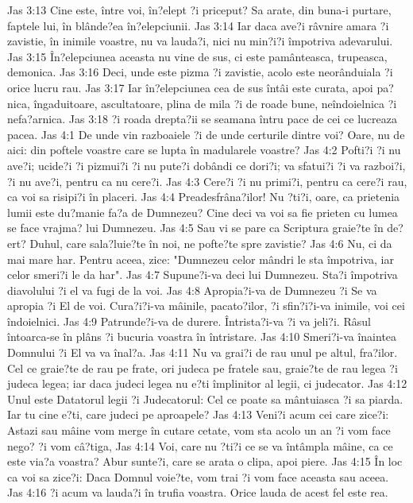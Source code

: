 Jas 3:13  Cine este, între voi, în?elept ?i priceput? Sa arate, din buna-i purtare, faptele lui, în blânde?ea în?elepciunii.
Jas 3:14  Iar daca ave?i râvnire amara ?i zavistie, în inimile voastre, nu va lauda?i, nici nu min?i?i împotriva adevarului.
Jas 3:15  În?elepciunea aceasta nu vine de sus, ci este pamânteasca, trupeasca, demonica.
Jas 3:16  Deci, unde este pizma ?i zavistie, acolo este neorânduiala ?i orice lucru rau.
Jas 3:17  Iar în?elepciunea cea de sus întâi este curata, apoi pa?nica, îngaduitoare, ascultatoare, plina de mila ?i de roade bune, neîndoielnica ?i nefa?arnica.
Jas 3:18  ?i roada drepta?ii se seamana întru pace de cei ce lucreaza pacea.
Jas 4:1  De unde vin razboaiele ?i de unde certurile dintre voi? Oare, nu de aici: din poftele voastre care se lupta în madularele voastre?
Jas 4:2  Pofti?i ?i nu ave?i; ucide?i ?i pizmui?i ?i nu pute?i dobândi ce dori?i; va sfatui?i ?i va razboi?i, ?i nu ave?i, pentru ca nu cere?i.
Jas 4:3  Cere?i ?i nu primi?i, pentru ca cere?i rau, ca voi sa risipi?i în placeri.
Jas 4:4  Preadesfrâna?ilor! Nu ?ti?i, oare, ca prietenia lumii este du?manie fa?a de Dumnezeu? Cine deci va voi sa fie prieten cu lumea se face vrajma? lui Dumnezeu.
Jas 4:5  Sau vi se pare ca Scriptura graie?te în de?ert? Duhul, care sala?luie?te în noi, ne pofte?te spre zavistie?
Jas 4:6  Nu, ci da mai mare har. Pentru aceea, zice: "Dumnezeu celor mândri le sta împotriva, iar celor smeri?i le da har".
Jas 4:7  Supune?i-va deci lui Dumnezeu. Sta?i împotriva diavolului ?i el va fugi de la voi.
Jas 4:8  Apropia?i-va de Dumnezeu ?i Se va apropia ?i El de voi. Cura?i?i-va mâinile, pacato?ilor, ?i sfin?i?i-va inimile, voi cei îndoielnici.
Jas 4:9  Patrunde?i-va de durere. Întrista?i-va ?i va jeli?i. Râsul întoarca-se în plâns ?i bucuria voastra în întristare.
Jas 4:10  Smeri?i-va înaintea Domnului ?i El va va înal?a.
Jas 4:11  Nu va grai?i de rau unul pe altul, fra?ilor. Cel ce graie?te de rau pe frate, ori judeca pe fratele sau, graie?te de rau legea ?i judeca legea; iar daca judeci legea nu e?ti împlinitor al legii, ci judecator.
Jas 4:12  Unul este Datatorul legii ?i Judecatorul: Cel ce poate sa mântuiasca ?i sa piarda. Iar tu cine e?ti, care judeci pe aproapele?
Jas 4:13  Veni?i acum cei care zice?i: Astazi sau mâine vom merge în cutare cetate, vom sta acolo un an ?i vom face nego? ?i vom câ?tiga,
Jas 4:14  Voi, care nu ?ti?i ce se va întâmpla mâine, ca ce este via?a voastra? Abur sunte?i, care se arata o clipa, apoi piere.
Jas 4:15  În loc ca voi sa zice?i: Daca Domnul voie?te, vom trai ?i vom face aceasta sau aceea.
Jas 4:16  ?i acum va lauda?i în trufia voastra. Orice lauda de acest fel este rea.
